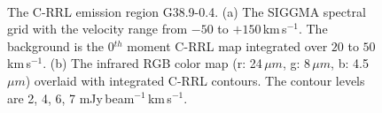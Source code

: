 \documentclass[manuscript]{aastex61}
\newcommand{\kms}{\,km\,s$^{-1}$}
\newcommand{\um}{\mu m}
\begin{document}
\begin{figure}[H]
	\centering
	\\
	\caption{The C-RRL emission region G38.9-0.4.
	(a) The SIGGMA spectral grid with the velocity range from $-50$ to $+150$\kms.
	The background is the 0$^{th}$ moment C-RRL map integrated over $20$ to $50$\kms.
	(b) The infrared RGB color map (r: 24\,$\um$, g: 8\,$\um$, b: 4.5\,$\um$) overlaid with integrated C-RRL contours.
	The contour levels are 2, 4, 6, 7 mJy\,beam$^{-1}$\kms.}
	\label{fig_crrl-g389}
\end{figure}
\end{document}
